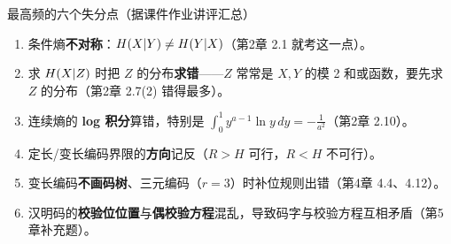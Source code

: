 \begin{warning}{最高频的六个失分点（据课件作业讲评汇总）}
\begin{enumerate}[leftmargin=1.6em,itemsep=1pt,topsep=2pt]
  \item 条件熵\textbf{不对称}：$H\!\left(X|Y\right)\neq H\!\left(Y|X\right)$（第2章 2.1 就考这一点）。
  \item 求 $H\!\left(X|Z\right)$ 时把 $Z$ 的分布\textbf{求错}——$Z$ 常常是 $X,Y$ 的模 2 和或函数，要先求 $Z$ 的分布（第2章 2.7(2) 错得最多）。
  \item 连续熵的 \textbf{log 积分}算错，特别是 $\displaystyle\int_0^1 y^{a-1}\ln y\,dy=-\frac{1}{a^2}$（第2章 2.10）。
  \item 定长/变长编码界限的\textbf{方向}记反（$R>H$ 可行，$R<H$ 不可行）。
  \item 变长编码\textbf{不画码树}、三元编码（$r=3$）时补位规则出错（第4章 4.4、4.12）。
  \item 汉明码的\textbf{校验位位置}与\textbf{偶校验方程}混乱，导致码字与校验方程互相矛盾（第5章补充题）。
\end{enumerate}
\end{warning}
